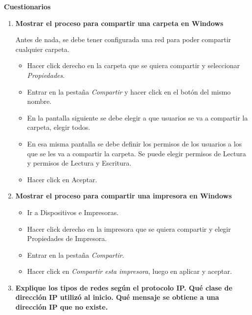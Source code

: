 \documentclass[a4paper,12pt]{article}
\begin{document}
\begin{large}
 \textbf{Cuestionarios}
\end{large}

\begin{enumerate}
 \item \textbf{Mostrar el proceso para compartir una carpeta en Windows}
 
 Antes de nada, se debe tener configurada una red para poder compartir cualquier carpeta.
 \begin{itemize}
  \item Hacer click derecho en la carpeta que se quiera compartir y seleccionar \textit{Propiedades}.
  \item Entrar en la pestaña \textit{Compartir} y hacer click en el botón del mismo nombre.
  \item En la pantalla siguiente se debe elegir a que usuarios se va a compartir la carpeta, elegir todos.
  \item En esa misma pantalla se debe definir los permisos de los usuarios a los que se les va a compartir la carpeta. Se 
  puede elegir permisos de Lectura y permisos de Lectura y Escritura.
  \item Hacer click en Aceptar.
 \end{itemize}

 \item \textbf{Mostrar el proceso para compartir una impresora en Windows}
 
 \begin{itemize}
  \item Ir a Dispositivos e Impresoras.
  \item Hacer click derecho en la impresora que se quiera compartir y elegir Propiedades de Impresora.
  \item Entrar en la pestaña \textit{Compartir}.
  \item Hacer click en \textit{Compartir esta impresora}, luego en aplicar y aceptar.
 \end{itemize}
 
 \item \textbf{Explique los tipos de redes según el protocolo IP.
 Qué clase de dirección IP utilizó al inicio. Qué mensaje se obtiene a una dirección IP que no existe.}


\end{enumerate}
\end{document}

